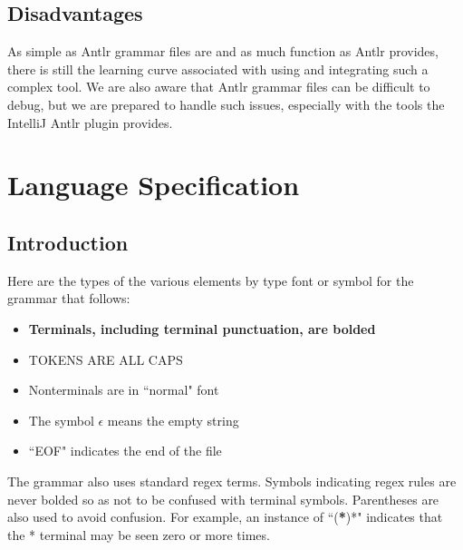 \documentclass{article}
\begin{document}
\subsection{Disadvantages}
As simple as Antlr grammar files are and as much function as Antlr provides, there is still the learning curve associated with using and integrating such a complex tool. We are also aware that Antlr grammar files can be difficult to debug, but we are prepared to handle such issues, especially with the tools the IntelliJ Antlr plugin provides.


\section{Language Specification}
\subsection{Introduction}
Here are the types of the various elements by type font or symbol for the grammar that follows:
\begin{itemize}
    \item \textbf{Terminals, including terminal punctuation, are bolded}
    \item TOKENS ARE ALL CAPS
    \item Nonterminals are in ``normal" font
    \item The symbol $\epsilon$ means the empty string
    \item ``EOF" indicates the end of the file
\end{itemize}
The grammar also uses standard regex terms. Symbols indicating regex rules are never bolded so as not to be confused with terminal symbols. Parentheses are also used to avoid confusion. For example, an instance of ``(\textbf{*})*" indicates that the * terminal may be seen zero or more times.
\end{document}
